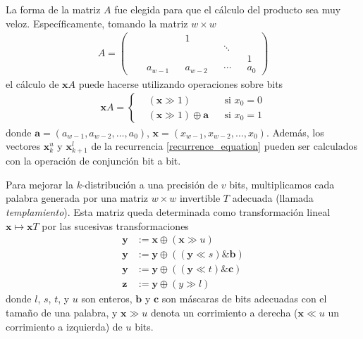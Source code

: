 \documentclass{article}
\DeclareMathOperator{\bitand}{\&}
\begin{document}
La forma de la matriz $A$ fue elegida para que el cálculo del  producto sea muy veloz.
Específicamente, tomando la matriz $w \times w$
\begin{align}
    A =
    \left(\begin{aligned}
        &&          &&1          &&       &&   \\
        &&          &&           &&\ddots &&   \\
        &&          &&           &&       &&1  \\
        &&a_{w-1}   &&a_{w-2}    &&\cdots &&a_0
    \end{aligned}\right)
\end{align}
el cálculo de $\mathbf{x} A$ puede hacerse utilizando operaciones sobre bits
\begin{align} \label{matrix_alternative}
    \mathbf{x} A = 
    \left\{\begin{aligned}
    & (\mathbf{x} \gg 1)  &&\text{si } x_0 = 0    \\
    & (\mathbf{x} \gg 1) \oplus \mathbf{a} && \text{si } x_0 = 1
    \end{aligned}\right.
\end{align}
donde $\mathbf{a} = (a_{w - 1}, a_{w - 2}, \dots, a_0)$, $\mathbf{x} = (x_{w - 1}, x_{w - 2}, \dots, x_0)$.
Además, los vectores $\mathbf{x}_k^u$ y $\mathbf{x}_{k + 1}^l$ de la recurrencia \ref{recurrence_equation} pueden ser calculados con la operación de conjunción bit a bit.

Para mejorar la $k$-distribución a una precisión de $v$ bits, multiplicamos cada palabra generada por una matriz $w \times w$ invertible $T$ adecuada (llamada \emph{templamiento}).
Esta matriz queda determinada como transformación lineal $\mathbf{x} \mapsto \mathbf{x} T$ por las sucesivas transformaciones
\begin{align}
    \mathbf{y} &:=
        \mathbf{x} \oplus (\mathbf{x} \gg u) \\
    \mathbf{y} &:=
        \mathbf{y} \oplus ((\mathbf{y} \ll s) \bitand \mathbf{b})    \\
    \mathbf{y} &:=
        \mathbf{y} \oplus ((\mathbf{y} \ll t) \bitand \mathbf{c})    \\
    \mathbf{z} &:=
        \mathbf{y} \oplus (y \gg l)
\end{align}
donde $l$, $s$, $t$, y $u$ son enteros, $\mathbf{b}$ y $\mathbf{c}$ son máscaras de bits adecuadas con el tamaño de una palabra, y $\mathbf{x} \gg u$ denota un corrimiento a derecha ($\mathbf{x} \ll u$ un corrimiento a izquierda) de $u$ bits.
\end{document}

